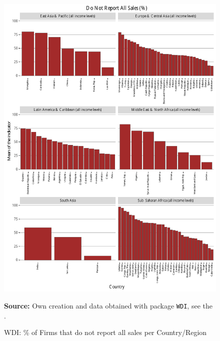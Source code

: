 \begin{figure}[H]
\begin{center}
\caption{WDI: \% of Firms that do not report all sales per Country/Region}
\label{fig_wdi_notsales}
\includegraphics[max height=.9\textheight]{../img/wdi_do_not_report_all_sales_perc.pdf}
\end{center}
\noindent \footnotesize{\textbf{Source:} Own creation and data obtained with package \texttt{WDI}, see the \cite{wb_r}.}
\end{figure}

